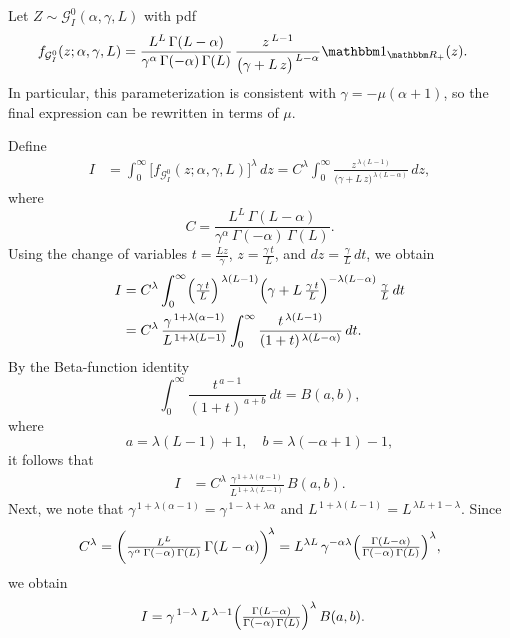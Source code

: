 \documentclass[11pt,]{article}
\begin{document}
\medskip

\noindent Let \(Z \sim \mathcal{G}^0_I(\alpha, \gamma, L)\) with pdf
\begin{align*}
f_{\mathcal{G}^0_I}(z; \alpha, \gamma, L) 
&= \frac{L^L\,\Gamma(L-\alpha)}{\gamma^{\alpha}\,\Gamma(-\alpha)\,\Gamma(L)}
   \,\frac{z^{\,L-1}}{\bigl(\gamma + L\,z\bigr)^{\,L-\alpha}}\mathbbm 1_{\mathbbm R_+}(z). \label{E:gamma1}
\end{align*} In particular, this parameterization is consistent with
\(\gamma = -\mu(\alpha + 1)\), so the final expression can be rewritten
in terms of \(\mu\).

\medskip

\noindent Define \begin{align*}
I 
&= \int_{0}^{\infty} \bigl[f_{\mathcal{G}^0_I}(z; \alpha, \gamma, L)\bigr]^\lambda \,dz
= C^\lambda 
  \int_{0}^{\infty} 
    \frac{z^{\,\lambda(L - 1)}}
         {\bigl(\gamma + L\,z\bigr)^{\,\lambda(L - \alpha)}} 
  \,dz,
\end{align*} where \[
C 
= \frac{L^L\,\Gamma(L - \alpha)}{\gamma^\alpha\,\Gamma(-\alpha)\,\Gamma(L)}.
\] Using the change of variables \(t = \tfrac{Lz}{\gamma}\),
\(z = \tfrac{\gamma\,t}{L}\), and \(dz = \tfrac{\gamma}{L}\,dt\), we
obtain \begin{align*}
I 
&= C^\lambda
   \int_{0}^{\infty}
     \Bigl(\tfrac{\gamma\,t}{L}\Bigr)^{\,\lambda(L - 1)}
     \Bigl(\gamma + L\,\tfrac{\gamma\,t}{L}\Bigr)^{-\lambda(L - \alpha)}
     \,\tfrac{\gamma}{L}\,dt
\\
&= C^\lambda 
   \,\frac{\gamma^{\,1+\lambda(\alpha - 1)}}{L^{\,1+\lambda(L - 1)}}
   \int_{0}^{\infty}
     \frac{t^{\,\lambda(L - 1)}}
          {(1 + t)^{\,\lambda(L - \alpha)}}
   \,dt.
\end{align*} By the Beta-function identity \[
\int_{0}^{\infty} \frac{t^{\,a - 1}}{(1 + t)^{\,a + b}} \, dt 
= B(a,b),
\] where \[
a = \lambda(L - 1) + 1,
\quad
b = \lambda(-\alpha + 1) - 1,
\] it follows that \begin{align*}
I 
&= C^\lambda \,\frac{\gamma^{\,1+\lambda(\alpha - 1)}}{L^{\,1+\lambda(L - 1)}}
   \,B(a,b).
\end{align*} Next, we note that
\(\gamma^{\,1 + \lambda(\alpha - 1)} = \gamma^{\,1 - \lambda + \lambda\alpha}\)
and \(L^{\,1 + \lambda(L - 1)} = L^{\,\lambda L + 1 - \lambda}.\) Since
\[
C^\lambda 
= \biggl(\tfrac{L^L}{\gamma^\alpha\,\Gamma(-\alpha)\,\Gamma(L)}\,\Gamma(L - \alpha)\biggr)^{\!\lambda}
= L^{\lambda L}\,\gamma^{-\alpha \lambda}
  \Bigl(\tfrac{\Gamma(L - \alpha)}{\Gamma(-\alpha)\,\Gamma(L)}\Bigr)^\lambda,
\] we obtain \begin{align*}
I
&= \gamma^{\,1 - \lambda}\,
   L^{\,\lambda - 1}
   \Bigl(\tfrac{\Gamma(L - \alpha)}{\Gamma(-\alpha)\,\Gamma(L)}\Bigr)^\lambda
   \,B(a,b).
\end{align*}
\end{document}
